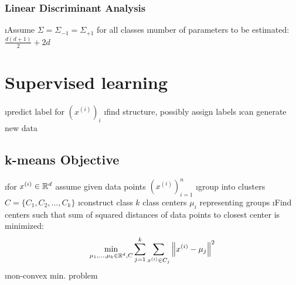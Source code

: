 \subsubsection{Linear Discriminant Analysis}

\bi
\i Assume $\Sigma = \Sigma_{-1} = \Sigma_{+1}$ for all classes
\i number of parameters to be estimated: $\frac{d(d+1)}{2} + 2d$
\ei

\section{Supervised learning}

\bi
\i predict label for $(x^{(i)})_i$
\i find structure, possibly assign labels
\i can generate new data
\ei

\subsection{k-means Objective}

\bi
\i for $x^{(i)} \in \mathbb{R}^d$ assume given data points $(x^{(i)})^n_{i=1}$
\i group into clusters $C = \{C_1, C_2, \ldots, C_k\}$
\i construct class $k$ class centers $\mu_i$ representing groups
\i Find centers such that sum of squared distances of data points to closest center is minimized: \[
\min_{\mu_1, \ldots, \mu_k \in \mathbb{R}^d, C} \displaystyle\sum_{j=1}^k \displaystyle\sum_{x^{(i)} \in C_j} \left\lVert x^{(i)} - \mu_j\right\rVert^2
\]
\i non-convex min. problem
\ei

